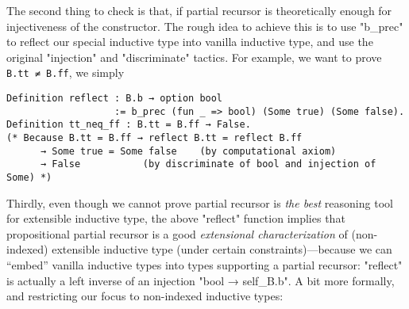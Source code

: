 The second thing to check is that, if partial recursor is theoretically enough for injectiveness of the constructor. The rough idea to achieve this
is to use "b_prec" to reflect our special inductive type into vanilla
inductive type, and use the original "injection" and "discriminate"
tactics. For example, we want to prove \texttt{B.tt ≠
B.ff}, we simply 
\begin{verbatim}
Definition reflect : B.b → option bool 
                   := b_prec (fun _ => bool) (Some true) (Some false).
Definition tt_neq_ff : B.tt = B.ff → False.
(* Because B.tt = B.ff → reflect B.tt = reflect B.ff 
      → Some true = Some false    (by computational axiom)
      → False           (by discriminate of bool and injection of Some) *)
\end{verbatim}


Thirdly, even though we cannot prove partial recursor is \textit{the best} reasoning tool for extensible inductive type,
the above "reflect" function implies that propositional partial
recursor is a good \textit{extensional characterization} of (non-indexed) extensible inductive type (under certain constraints)---because we can ``embed'' vanilla inductive types into
types supporting a partial recursor: "reflect" is actually a left
inverse of an injection "bool → self_B.b". A bit more formally, and
restricting our focus to non-indexed inductive types:


